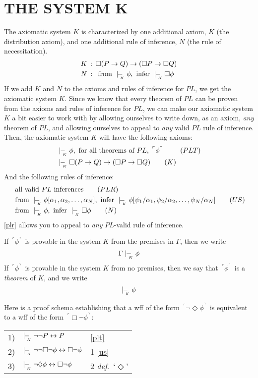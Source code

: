 \documentclass[landscape, two column, full page,reqno]{article}
\newcommand{\p}{\item}
\newcommand{\e}{\emph}
\newcommand{\fns}[1]{{\footnotesize #1}}
\newcommand{\qq}[1]{ ~\!^\ulcorner #1  ^\urcorner~\!}
\newcommand{\kproves}{\mid\hspace{-3.9pt}-_{\!\!\!\raisebox{-3pt}{\text{\tiny$K$}}}\hspace{3pt}}
\newcommand{\D}{\Diamond}
\newcommand{\B}{\Box}
\newcommand{\hs}{\hspace{2pt}}
\newcommand{\aproof}[2]{\begin{center}
\begin{tabularx}{#1}{l X l}
#2
\end{tabularx}
\end{center}}
\begin{document}
\section{T\fns{HE} S\fns{YSTEM} K}
\p The axiomatic system $K$ is characterized by one additional axiom, $K$ (the distribution axiom), and one additional rule of inference, $N$ (the rule of necessitation).  
		\[\begin{aligned}
		K \hs &: \hs \B( P \to Q) \to (\B P \to \B Q)	\\
		N \hs &: \hs \mbox{ from } \kproves \phi, \mbox{ infer } \kproves \B \phi
		\end{aligned}\]
If we add $K$ and $N$ to the axioms and rules of inference for $PL$, we get the axiomatic system $K$.  Since we know that every  theorem of $PL$ can be proven from the axioms and rules of inference for $PL$, we can make our axiomatic system $K$ a bit easier to work with by allowing ourselves to write down, as an axiom, \e{any} theorem of $PL$, and allowing ourselves to appeal to \e{any} valid $PL$ rule of inference.  Then, the axiomatic system $K$ will have the following axioms:
		\begin{align}
		& \kproves \phi, \text{ for all theorems of $PL$, $\qq{\phi}$ }			\tag{$PLT$}\label{plt}	\\
		& \kproves\B( P \to Q) \to (\B P \to \B Q)	\tag{$K$}\label{k}
		 \end{align}
And the following rules of inference:
		\begin{align}
		&\text{ all valid $PL$ inferences} 	\tag{$PLR$}\label{plr}	\\
		&\text{ from } \kproves \phi[\alpha_1, \alpha_2, \dots, \alpha_N] , \text{ infer } \kproves \phi [\psi_1/\alpha_1, \psi_2/\alpha_2, \dots, \psi_N/\alpha_N]	\tag{$US$}\label{us}\\
		& \mbox{ from } \kproves \phi, \mbox{ infer } \kproves \B \phi \tag{$N$}\label{n}
		\end{align}
\eqref{plr} allows you to appeal to \e{any} $PL$-valid rule of inference. 
\p If $\qq{\phi}$ is provable in the system $K$ from the premises in $\Gamma$, then we write
		\[
		\Gamma \kproves \phi
		\]
If $\qq{\phi}$ is provable in the system $K$ from no premises, then we say that $\qq{\phi}$ is a \e{theorem} of $K$, and we write
		\[
		\kproves \phi
		\]
\p Here is a proof schema establishing that a wff of the form $\qq{\neg \D \phi}$ is equivalent to a wff of the form $\qq{\B \neg \phi}$:
	\aproof{200pt}{
	1) & $\kproves \neg \neg P \leftrightarrow P$		&	\eqref{plt}	\\
	2)	&	$\kproves \neg \neg \B \neg \phi \leftrightarrow \B \neg \phi$	&	1 \eqref{us}	\\
	3) & $\kproves \neg \D \phi \leftrightarrow \B \neg \phi$			&	2 \e{def}.~`$\D$'
	}
\end{document}
